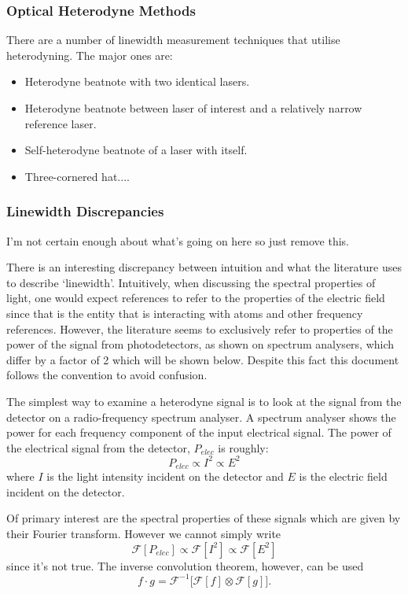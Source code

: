 \subsubsection{Optical Heterodyne Methods}

There are a number of linewidth measurement techniques that utilise heterodyning. The major ones are:
\begin{itemize}
\item Heterodyne beatnote with two identical lasers.
\item Heterodyne beatnote between laser of interest and a relatively narrow reference laser.
\item Self-heterodyne beatnote of a laser with itself.
\item Three-cornered hat....
\end{itemize}

\subsubsection{Linewidth Discrepancies}
{\color{red}I'm not certain enough about what's going on here so just remove this.}

There is an interesting discrepancy between intuition and what the literature uses to describe `linewidth'.
Intuitively, when discussing the spectral properties of light, one would expect references to refer to the properties of the electric field since that is the entity that is interacting with atoms and other frequency references.
However, the literature seems to exclusively refer to properties of the power of the signal from photodetectors, as shown on spectrum analysers, which differ by a factor of 2 which will be shown below.
Despite this fact this document follows the convention to avoid confusion.

The simplest way to examine a heterodyne signal is to look at the signal from the detector on a radio-frequency spectrum analyser.
A spectrum analyser shows the power for each frequency component of the input electrical signal.
The power of the electrical signal from the detector, $P_{elec}$ is roughly:
\begin{equation}
P_{elec}\propto I^2 \propto E^2
\label{eq:beatnote_proportional}
\end{equation}
where $I$ is the light intensity incident on the detector and $E$ is the electric field incident on the detector.

Of primary interest are the spectral properties of these signals which are given by their Fourier transform.
However we cannot simply write
\begin{equation}
\mathcal{F}[P_{elec}]\propto \mathcal{F}[I^2] \propto \mathcal{F}[E^2]
\end{equation}
since it's not true.
The inverse convolution theorem, however, can be used
\begin{equation}
f\cdot g = \mathcal{F}^{-1} \bigg[ \mathcal{F}[f] \otimes\mathcal{F}[g]\bigg].
\end{equation}


